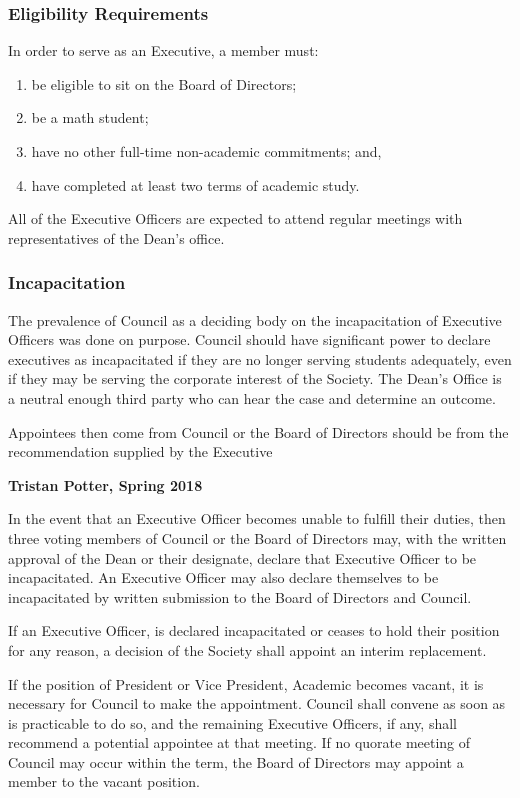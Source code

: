 \subsubsection{Eligibility Requirements}
In order to serve as an Executive, a member must:
\begin{enumerate}
    \item be eligible to sit on the Board of Directors;
    \item be a math student; 
    \item have no other full-time non-academic commitments; and,
    \item have completed at least two terms of academic study.
\end{enumerate}

All of the Executive Officers are expected to attend regular meetings with
representatives of the Dean’s office.

\subsubsection{Incapacitation}
\begin{annotation}
    The prevalence of Council as a deciding body on the incapacitation of 
    Executive Officers was done on purpose. Council should have significant
    power to declare executives as incapacitated if they are no longer
    serving students adequately, even if they may be serving the corporate
    interest of the Society. The Dean's Office is a neutral enough third party
    who can hear the case and determine an outcome.

    Appointees then come from Council or the Board of Directors should be from
    the recommendation supplied by the Executive

    \textbf{Tristan Potter, Spring 2018}
\end{annotation}

In the event that an Executive Officer becomes unable to fulfill their duties,
then three voting members of Council or the Board of Directors may,
with the written approval of the Dean or their designate, declare that Executive
Officer to be incapacitated. An Executive Officer may also declare themselves
to be incapacitated by written submission to the Board of Directors and
Council.

If an Executive Officer, is declared incapacitated or ceases to hold their
position for any reason, a decision of the Society shall appoint an interim
replacement. 

If the position of President or Vice President, Academic becomes vacant, it
is necessary for Council to make the appointment. Council shall convene
as soon as is practicable to do so, and the remaining Executive Officers, if
any, shall recommend a potential appointee at that meeting. If no quorate
meeting of Council may occur within the term, the Board of Directors may 
appoint a member to the vacant position.

